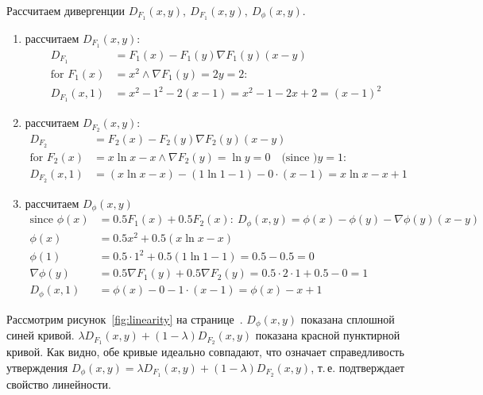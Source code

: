 \documentclass[12pt]{scrartcl}
\begin{document}
Рассчитаем дивергенции $D_{F_{1}}(x,y),\ D_{F_{1}}(x,y),\ D_{\phi}(x,y)$.
\begin{enumerate}
    \item рассчитаем $D_{F_{1}}(x,y)$:
    \begin{align*}
        D_{F_{1}} &= F_{1}(x) - F_{1}(y) \nabla F_{1}(y)(x - y)\\
        \text{for } F_{1}(x) &= x^{2} \wedge \nabla F_{1}(y) = 2y = 2:\\
        D_{F_{1}}(x,1) &= x^{2} - 1^2 - 2(x - 1) = x^2 - 1 - 2x + 2 = (x - 1)^{2}
    \end{align*}
    \item рассчитаем $D_{F_{2}}(x,y)$:
    \begin{align*}
        D_{F_{2}} &= F_{2}(x) - F_{2}(y) \nabla F_{2}(y)(x - y)\\
        \text{for } F_{2}(x) &= x \ln x - x \wedge \nabla F_{2}(y) = \ln y = 0\quad \text{(since )} y = 1:\\
        D_{F_{2}}(x,1) &= (x \ln x - x) - (1\ln 1 - 1) - 0 \cdot (x - 1) = x \ln x - x + 1
    \end{align*}
    \item рассчитаем $D_\phi(x,y)$
    \begin{align*}
        \text{since } \phi(x) &= 0.5F_{1}(x) + 0.5F_{2}(x):\ D_\phi(x,y) = \phi(x) -\phi(y) - \nabla \phi(y)(x - y)\\
        \phi(x) &= 0.5x^{2} + 0.5(x \ln x - x)\\
        \phi(1) &= 0.5 \cdot 1^{2} + 0.5(1 \ln 1 - 1) = 0.5 - 0.5 = 0\\
        \nabla \phi (y) &= 0.5 \nabla F_{1}(y) + 0.5 \nabla F_{2}(y) = 0.5 \cdot 2 \cdot 1 + 0.5-0 = 1\\
        D_\phi(x,1) &= \phi(x) - 0 - 1 \cdot (x - 1) = \phi(x) - x + 1
    \end{align*}
\end{enumerate}
Рассмотрим рисунок~\ref{fig:linearity} на странице~\pageref{fig:linearity}. $D_{\phi}(x,y)$ показана сплошной синей кривой. $\lambda D_{F_{1}}(x,y) + (1 - \lambda)D_{F_{2}}(x,y)$ показана красной пунктирной кривой. Как видно, обе кривые идеально совпадают, что означает справедливость утверждения $D_{\phi}(x,y) = \lambda D_{F_{1}}(x,y) + (1 - \lambda)D_{F_{2}}(x,y)$, т.\,е. подтверждает свойство линейности.
\end{document}
